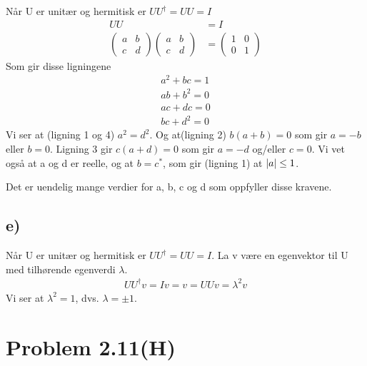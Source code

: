 \documentclass[norsk,a4paper,12pt]{article}
\begin{document}
		Når U er unitær og hermitisk er $UU^\dagger = UU = I$
		\begin{equation}
		\begin{aligned}
		UU &= I \\
		\begin{pmatrix} a & b \\ c & d \end{pmatrix} \begin{pmatrix} a & b \\ c & d \end{pmatrix} &= \begin{pmatrix} 1 & 0 \\ 0 & 1 \end{pmatrix}
		\end{aligned}
		\end{equation}
		Som gir disse ligningene
		\begin{equation}
		\begin{aligned}
		a^2 +bc = 1 \\
		ab + b^2 = 0 \\
		ac + dc = 0 \\
		bc + d^2 = 0
		\end{aligned}
		\end{equation}
		Vi ser at (ligning 1 og 4) $a^2 = d^2$. Og at(ligning 2) $b(a + b) = 0$ som gir $a = -b$ eller $b = 0$. Ligning 3 gir $c(a + d) = 0$ som gir $a = -d$ og/eller $c = 0$. Vi vet også at a og d er reelle, og at $b = c^*$, som gir (ligning 1) at $\abs{a} \leq 1$.
		
		Det er uendelig mange verdier for a, b, c og d som oppfyller disse kravene.
		
	\subsection*{e)}
		
		Når U er unitær og hermitisk er $UU^\dagger = UU = I$. La v være en egenvektor til U med tilhørende egenverdi $\lambda$.
		\begin{equation}
		\begin{aligned}
		UU^\dagger v = Iv = v = UUv = \lambda^2 v 
		\end{aligned}
		\end{equation}
		Vi ser at $\lambda^2 = 1$, dvs. $\lambda = \pm 1$.
		
	\section*{Problem 2.11(H)}
	
\end{document}
